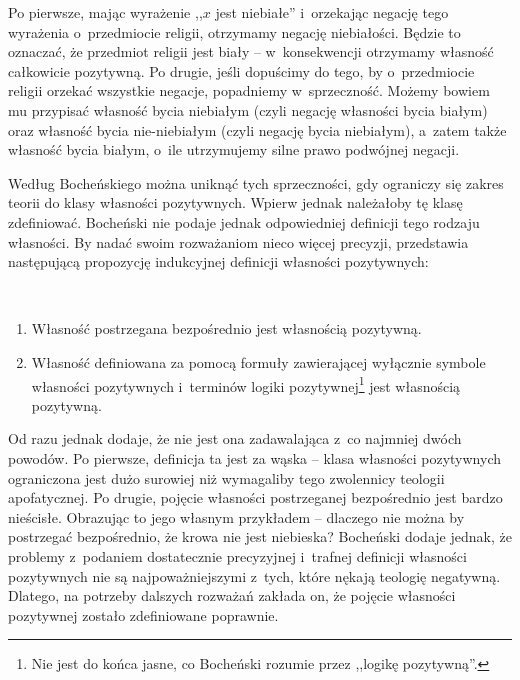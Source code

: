 Po pierwsze, mając wyrażenie ,,$x$ jest niebiałe'' i~orzekając negację tego wyrażenia o~przedmiocie religii, otrzymamy negację niebiałości. Będzie to oznaczać, że przedmiot religii jest biały -- w~konsekwencji otrzymamy własność całkowicie pozytywną. Po drugie, jeśli dopuścimy do tego, by o~przedmiocie religii orzekać wszystkie negacje, popadniemy w~sprzeczność. Możemy bowiem mu przypisać własność bycia niebiałym (czyli negację własności bycia białym) oraz własność bycia nie-niebiałym (czyli negację bycia niebiałym), a~zatem także własność bycia białym, o~ile utrzymujemy silne prawo podwójnej negacji.

Według Bocheńskiego można uniknąć tych sprzeczności, gdy ograniczy się zakres teorii do klasy własności pozytywnych. Wpierw jednak należałoby tę klasę zdefiniować. Bocheński nie podaje jednak odpowiedniej definicji tego rodzaju własności. By nadać swoim rozważaniom nieco więcej precyzji, przedstawia następującą propozycję indukcyjnej definicji własności pozytywnych:
\begin{defin}\label{sil-boch-pozytywna}\hfill\ 
\begin{enumerate}%
\item Własność postrzegana bezpośrednio jest własnością pozytywną.
\item Własność definiowana za pomocą formuły zawierającej wyłącznie symbole własności pozytywnych i~terminów logiki pozytywnej\footnote{Nie jest do końca jasne, co Bocheński rozumie przez ,,logikę pozytywną''.} jest własnością pozytywną.
\end{enumerate}
\end{defin}
Od razu jednak dodaje, że nie jest ona zadawalająca z~co najmniej dwóch powodów. Po pierwsze, definicja ta jest za wąska -- klasa własności pozytywnych ograniczona jest dużo surowiej niż wymagaliby tego zwolennicy teologii apofatycznej. Po drugie, pojęcie własności postrzeganej bezpośrednio jest bardzo nieścisłe. Obrazując to jego własnym przykładem -- dlaczego nie można by postrzegać bezpośrednio, że krowa nie jest niebieska? Bocheński dodaje jednak, że problemy z~podaniem dostatecznie precyzyjnej i~trafnej definicji własności pozytywnych nie są najpoważniejszymi z~tych, które nękają teologię negatywną. Dlatego, na potrzeby dalszych rozważań zakłada on, że pojęcie własności pozytywnej zostało zdefiniowane poprawnie.

